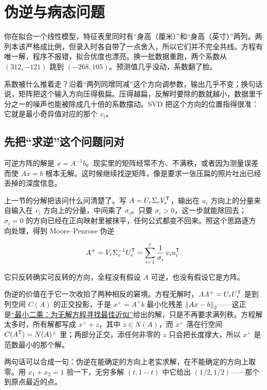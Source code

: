 \section{伪逆与病态问题}
\label{sec:03-Linear-Algebra/07-SVD-and-Data-Applications/02}

你在拟合一个线性模型，特征表里同时有``身高（厘米）''和``身高（英寸）''两列。两列本该严格成比例，但录入时各自带了一点舍入，所以它们并不完全共线。方程有唯一解，程序不报错，拟合优度也漂亮。换一批数据重跑，两个系数从 \((312,-121)\) 跳到 \((-268,105)\)。预测值几乎没动，系数翻了脸。

系数被什么推着走？沿着``两列同增同减''这个方向调参数，输出几乎不变；换句话说，矩阵把这个输入方向压得极扁。压得越扁，反解时要除的数就越小，数据里千分之一的噪声也能被除成几十倍的系数摆动。SVD 把这个方向的位置指得很准：它就是最小奇异值对应的那个 \(v_i\)。

\subsection{先把``求逆''这个问题问对}

可逆方阵的解是 \(x=A^{-1}b\)。现实里的矩阵经常不方、不满秩，或者因为测量误差而使 \(Ax=b\) 根本无解。这时候继续找逆矩阵，像是要求一张压扁的照片吐出已经丢掉的深度信息。

上一节的分解把该问什么问清楚了。写 \(A=U_r\Sigma_rV_r^{\mathsf{T}}\)，输出在 \(u_i\) 方向上的分量来自输入在 \(v_i\) 方向上的分量，中间乘了 \(\sigma_i\)。只要 \(\sigma_i>0\)，这一步就能除回去；\(\sigma_i=0\) 的方向已经在正向映射里被抹平，任何公式都变不回来。照这个思路逐方向处理，得到 Moore--Penrose 伪逆

\[
A^{+}=V_r\Sigma_r^{-1}U_r^{\mathsf{T}}
=\sum_{i=1}^{r}\frac{1}{\sigma_i}\,v_i u_i^{\mathsf{T}}.
\]

它只反转确实可反转的方向，全程没有假设 \(A\) 可逆，也没有假设它是方阵。

伪逆的价值在于它一次收拾了两种相反的窘境。方程无解时，\(AA^{+}=U_rU_r^{\mathsf{T}}\) 是到列空间 \(C(A)\) 的正交投影，于是 \(x^{+}=A^{+}b\) 最小化残差 \(\left\lVert Ax-b\right\rVert_2\)——这正是\hyperref[sec:03-Linear-Algebra/03-Orthogonality/03]{``最小二乘：为无解方程寻找最佳近似''}给出的解，只是不再要求满列秩。方程解太多时，所有解都写成 \(x^{+}+z\)，其中 \(z\in N(A)\)，而 \(x^{+}\) 落在行空间 \(C(A^{\mathsf{T}})=N(A)^{\perp}\) 里；两部分正交，添任何非零的 \(z\) 只会把长度撑大，所以 \(x^{+}\) 是范数最小的那个解。

两句话可以合成一句：伪逆在能确定的方向上老实求解，在不能确定的方向上取零。用 \(x_1+x_2=1\) 验一下，无穷多解 \((t,1-t)\) 中它给出 \((1/2,1/2)\)——那个到原点最近的点。

